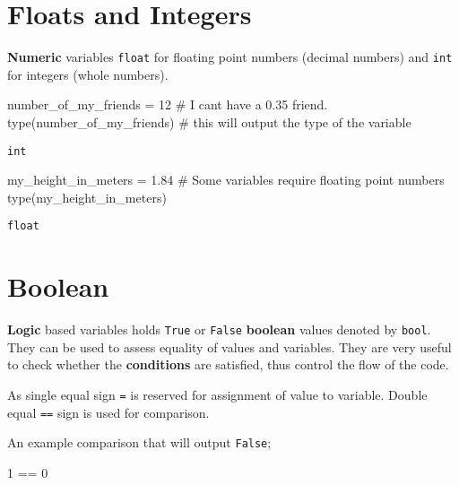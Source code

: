 \documentclass[
  letterpaper,
  DIV=11,
  numbers=noendperiod]{scrreprt}
\newenvironment{Shaded}{\begin{snugshade}}{\end{snugshade}}
\newcommand{\BuiltInTok}[1]{\textcolor[rgb]{0.00,0.23,0.31}{#1}}
\newcommand{\CommentTok}[1]{\textcolor[rgb]{0.37,0.37,0.37}{#1}}
\newcommand{\DecValTok}[1]{\textcolor[rgb]{0.68,0.00,0.00}{#1}}
\newcommand{\FloatTok}[1]{\textcolor[rgb]{0.68,0.00,0.00}{#1}}
\newcommand{\NormalTok}[1]{\textcolor[rgb]{0.00,0.23,0.31}{#1}}
\newcommand{\OperatorTok}[1]{\textcolor[rgb]{0.37,0.37,0.37}{#1}}
\begin{document}
\section{Floats and Integers}\label{floats-and-integers}

\textbf{Numeric} variables \texttt{float} for floating point numbers
(decimal numbers) and \texttt{int} for integers (whole numbers).

\begin{Shaded}
\begin{Highlighting}[]
\NormalTok{number\_of\_my\_friends }\OperatorTok{=} \DecValTok{12} \CommentTok{\# I can\textquotesingle{}t have a 0.35 friend.}
\BuiltInTok{type}\NormalTok{(number\_of\_my\_friends) }\CommentTok{\# this will output the type of the variable}
\end{Highlighting}
\end{Shaded}

\begin{verbatim}
int
\end{verbatim}

\begin{Shaded}
\begin{Highlighting}[]
\NormalTok{my\_height\_in\_meters }\OperatorTok{=} \FloatTok{1.84} \CommentTok{\# Some variables require floating point numbers}
\BuiltInTok{type}\NormalTok{(my\_height\_in\_meters)}
\end{Highlighting}
\end{Shaded}

\begin{verbatim}
float
\end{verbatim}

\section{Boolean}\label{boolean}

\textbf{Logic} based variables holds \texttt{True} or \texttt{False}
\textbf{boolean} values denoted by \texttt{bool}. They can be used to
assess equality of values and variables. They are very useful to check
whether the \textbf{conditions} are satisfied, thus control the flow of
the code.

As single equal sign \texttt{=} is reserved for assignment of value to
variable. Double equal \texttt{==} sign is used for comparison.

An example comparison that will output \texttt{False};

\begin{Shaded}
\begin{Highlighting}[]
\DecValTok{1} \OperatorTok{==} \DecValTok{0}
\end{Highlighting}
\end{Shaded}
\end{document}
